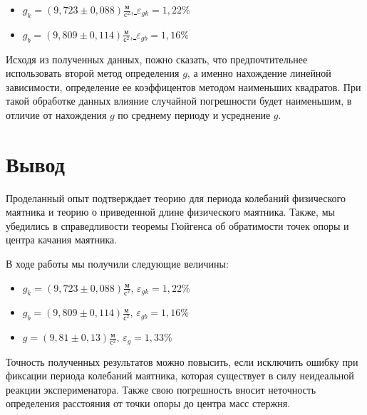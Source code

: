 \documentclass[a4paper,12pt]{article}
\begin{document}
 	\begin{itemize}
 		
 		\item \underline{$ g_k = \left( 9,723\pm 0,088\right) \frac{\text{м}}{\text{с}^2} $, $ \varepsilon_{gk} = 1,22\% $}
 		
 		\item \underline{$ g_b = \left( 9,809\pm 0,114\right) \frac{\text{м}}{\text{с}^2} $, $ \varepsilon_{gb} = 1,16\% $}
 		
 		
 		
 	\end{itemize}
 	
 	
 	Исходя из полученных данных, пожно сказать, что предпочтительнее использовать второй метод определения $g$, а именно нахождение линейной зависимости, определение ее коэффицентов методом наименьших квадратов. При такой обработке данных влияние случайной погрешности будет наименьшим, в отличие от нахождения $g$ по среднему периоду и усреднение $g$.
 	
 	
 	\section{Вывод}
 	Проделанный опыт подтверждает теорию для периода колебаний физического маятника и теорию о приведенной длине физического маятника. Также, мы убедились в справедливости теоремы Гюйгенса об обратимости точек опоры и центра качания маятника.
 	
 	В ходе работы мы получили следующие величины:
 	\begin{itemize}
 		\item $ g_k = \left( 9,723\pm 0,088\right) \frac{\text{м}}{\text{с}^2} $, $ \varepsilon_{gk} = 1,22\% $
 		
 		\item $ g_b = \left( 9,809\pm 0,114\right) \frac{\text{м}}{\text{с}^2} $, $ \varepsilon_{gb} = 1,16\% $
 		
 		\item $ g = \left( 9,81\pm 0,13\right) \frac{\text{м}}{\text{с}^2} $, $ \varepsilon_g = 1,33\% $
 	\end{itemize}
 	
 
 	Точность полученных результатов можно повысить, если исключить ошибку при фиксации периода колебаний маятника, которая существует в силу неидеальной реакции эксперименатора. Также свою погрешность вносит неточность определения расстояния от точки опоры до центра масс стержня.
 	
 	
 	
 	
 	
 	
 
\end{document}
